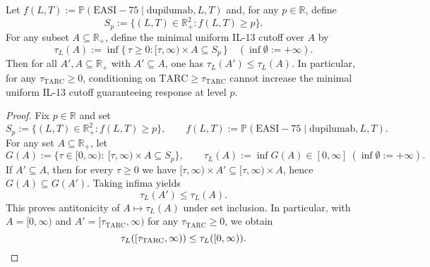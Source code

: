 ﻿\begin{proposition}\label{prop:il13-cutoff-monotone}
Let \(f(L,T):=\mathbb{P}(\mathrm{EASI}{-}75\mid \text{dupilumab},L,T)\) and, for any \(p\in\mathbb{R}\), define
\[
S_p := \{ (L,T) \in \mathbb{R}_+^2 : f(L,T) \ge p \}.
\]
For any subset \(A\subseteq \mathbb{R}_+\), define the minimal uniform IL-13 cutoff over \(A\) by
\[
\tau_L(A) := \inf\{ \,\tau \ge 0 : [\tau,\infty) \times A \subseteq S_p \,\}\quad (\inf\emptyset := +\infty).
\]
Then for all \(A',A \subseteq \mathbb{R}_+\) with \(A'\subseteq A\), one has \(\tau_L(A') \le \tau_L(A)\). In particular, for any \(\tau_{\mathrm{TARC}} \ge 0\), conditioning on \(\mathrm{TARC} \ge \tau_{\mathrm{TARC}}\) cannot increase the minimal uniform IL-13 cutoff guaranteeing response at level \(p\).
\end{proposition}

\begin{proof}
Fix \(p\in\mathbb{R}\) and set
\[
S_p:=\{(L,T)\in\mathbb{R}_+^2: f(L,T)\ge p\},\qquad f(L,T):=\mathbb{P}(\mathrm{EASI}{-}75\mid \text{dupilumab},L,T).
\]
For any set \(A\subseteq\mathbb{R}_+\), let
\[
G(A):=\{\tau\in[0,\infty):\ [\tau,\infty)\times A\subseteq S_p\},\qquad \tau_L(A):=\inf G(A)\in[0,\infty] \ (\inf\emptyset:=+\infty).
\]
If \(A'\subseteq A\), then for every \(\tau\ge0\) we have \([\tau,\infty)\times A'\subseteq[\tau,\infty)\times A\), hence \(G(A)\subseteq G(A')\). Taking infima yields
\[
\tau_L(A')\le \tau_L(A).
\]
This proves antitonicity of \(A\mapsto \tau_L(A)\) under set inclusion. In particular, with \(A=[0,\infty)\) and \(A'=[\tau_{\mathrm{TARC}},\infty)\) for any \(\tau_{\mathrm{TARC}}\ge0\), we obtain
\[
\tau_L([\tau_{\mathrm{TARC}},\infty))\le \tau_L([0,\infty)).\qedhere
\]
\end{proof}
